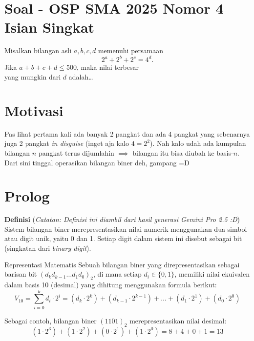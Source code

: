 \section{Soal - OSP SMA 2025 Nomor 4 Isian Singkat}
Misalkan bilangan asli $a, b, c, d$ memenuhi persamaan $$2^a+2^b+2^c=4^d.$$
    Jika $a+b+c+d \le 500$, maka nilai terbesar\\ yang mungkin dari $d$ adalah\dots

\newpage
\section{Motivasi}
Pas lihat pertama kali ada banyak 2 pangkat dan ada 4 pangkat yang sebenarnya juga 2 pangkat \textit{in disguise} (inget aja kalo $4 = 2^2$). Nah kalo udah ada kumpulan bilangan $n$ pangkat terus dijumlahin $\implies$ bilangan itu bisa diubah ke basis-$n$. Dari sini tinggal operasikan bilangan biner deh, gampang =D

\section{Prolog}
\textbf{Definisi}
(\textit{Catatan: Definisi ini diambil dari hasil generasi Gemini Pro 2.5 :D})\\
Sistem bilangan biner merepresentasikan nilai numerik menggunakan dua simbol atau digit unik, yaitu 0 dan 1. Setiap digit dalam sistem ini disebut sebagai bit (singkatan dari \textit{binary digit}).

Representasi Matematis
Sebuah bilangan biner yang direpresentasikan sebagai barisan bit $(d_k d_{k-1} \dots d_1 d_0)_2$, di mana setiap $d_i \in \{0, 1\}$, memiliki nilai ekuivalen dalam basis 10 (desimal) yang dihitung menggunakan formula berikut:
$$V_{10} = \sum_{i=0}^{k} d_i \cdot 2^i = (d_k \cdot 2^k) + (d_{k-1} \cdot 2^{k-1}) + \dots + (d_1 \cdot 2^1) + (d_0 \cdot 2^0)$$

Sebagai contoh, bilangan biner $(1101)_2$ merepresentasikan nilai desimal:$$(1 \cdot 2^3) + (1 \cdot 2^2) + (0 \cdot 2^1) + (1 \cdot 2^0) = 8 + 4 + 0 + 1 = 13$$


